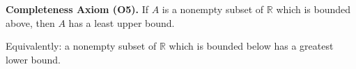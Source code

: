 \textbf{Completeness Axiom (O5).} If $A$ is a nonempty subset of $\mathbb{R}$ which is bounded above, then $A$ has a least upper bound.

Equivalently: a nonempty subset of $\mathbb{R}$ which is bounded below has a greatest lower bound.
